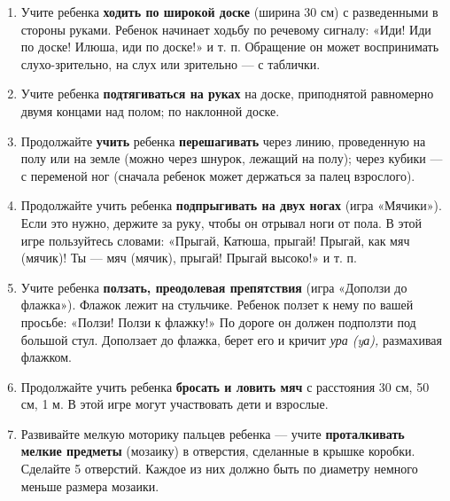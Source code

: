 \documentclass[a5paper]{book}
\renewcommand{\emph}[1]{\textit{#1}}
\begin{document}
\begin{enumerate}
\def\labelenumi{\arabic{enumi}.}
\item
  
  Учите ребенка \textbf{ходить по широкой доске} (ширина 30 см) с
  разведенными в стороны руками. Ребенок начинает ходьбу по речевому
  сигналу: «Иди! Иди по доске! Илюша, иди по доске!» и т. п. Обращение
  он может воспринимать слухо-зрительно, на слух или зрительно --- с
  таблички.
  
\item
  
  Учите ребенка \textbf{подтягиваться на руках} на доске, приподнятой
  равномерно двумя концами над полом; по наклонной доске.
  
\item
  
  Продолжайте \textbf{учить} ребенка \textbf{перешагивать} через линию,
  проведенную на полу или на земле (можно через шнурок, лежащий на
  полу); через кубики --- с переменой ног (сначала ребенок может
  держаться за палец взрослого).
  
\item
  
  Продолжайте учить ребенка \textbf{подпрыгивать на двух ногах} (игра
  «Мячики»). Если это нужно, держите за руку, чтобы он отрывал ноги от
  пола. В этой игре пользуйтесь словами: «Прыгай, Катюша, прыгай!
  Прыгай, как мяч (мячик)! Ты --- мяч (мячик), прыгай! Прыгай высоко!» и
  т. п.
  
\item
  
  Учите ребенка \textbf{ползать, преодолевая препятствия} (игра «Доползи
  до флажка»). Флажок лежит на стульчике. Ребенок ползет к нему по вашей
  просьбе: «Ползи! Ползи к флажку!» По дороге он должен подползти под
  большой стул. Доползает до флажка, берет его и кричит \emph{ура (yа),}
  размахивая флажком.
  
\item
  
  Продолжайте учить ребенка \textbf{бросать и ловить мяч} с расстояния
  30 см, 50 см, 1 м. В этой игре могут участвовать дети и взрослые.
  
\item
  
  Развивайте мелкую моторику пальцев ребенка --- учите
  \textbf{проталкивать мелкие предметы} (мозаику) в отверстия, сделанные
  в крышке коробки. Сделайте 5 отверстий. Каждое из них должно быть по
  диаметру немного меньше размера мозаики.
  
\end{enumerate}
\end{document}
